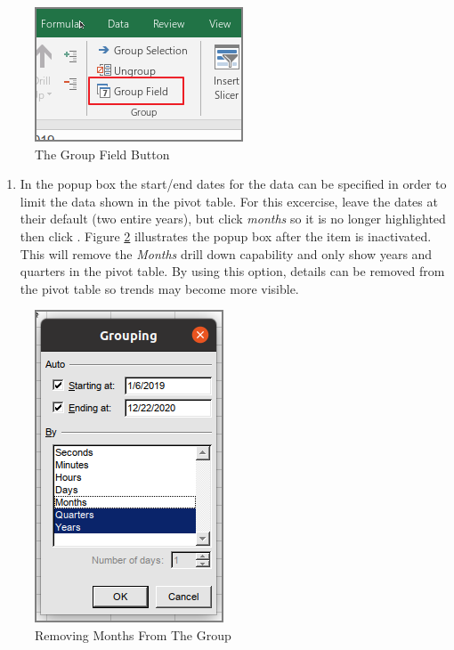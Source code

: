 \begin{figure}[H]
	\centering
	\includegraphics[width=\maxwidth{.95\linewidth}]{gfx/ch07_fig23}
	\caption{The Group Field Button}
	\label{07:fig23}
\end{figure}

\begin{enumerate}[resume]
	\item In the  popup box the start/end dates for the data can be specified in order to limit the data shown in the pivot table. For this excercise, leave the dates at their default (two entire years), but click \textit{months} so it is no longer highlighted then click . Figure \ref{07:fig24} illustrates the  popup box after the  item is inactivated. This will remove the \textit{Months} drill down capability and only show years and quarters in the pivot table. By using this option, details can be removed from the pivot table so trends may become more visible.
\end{enumerate}

\begin{figure}[H]
	\centering
	\includegraphics[width=\maxwidth{.95\linewidth}]{gfx/ch07_fig24}
	\caption{Removing Months From The Group}
	\label{07:fig24}
\end{figure}

